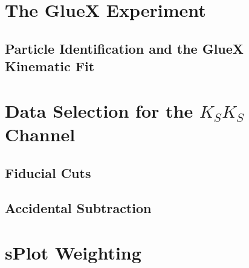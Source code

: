 \section{The GlueX Experiment}

\subsection{Particle Identification and the GlueX Kinematic Fit}\label{sub:particle-identification-and-the-gluex-kinematic-fit}

\section{Data Selection for the $K_SK_S$ Channel}\label{sec:data-selection}

\subsection{Fiducial Cuts}\label{sub:fiducial-cuts}

\subsection{Accidental Subtraction}\label{sub:accidental-subtraction}

\section{sPlot Weighting}\label{sec:splot}

